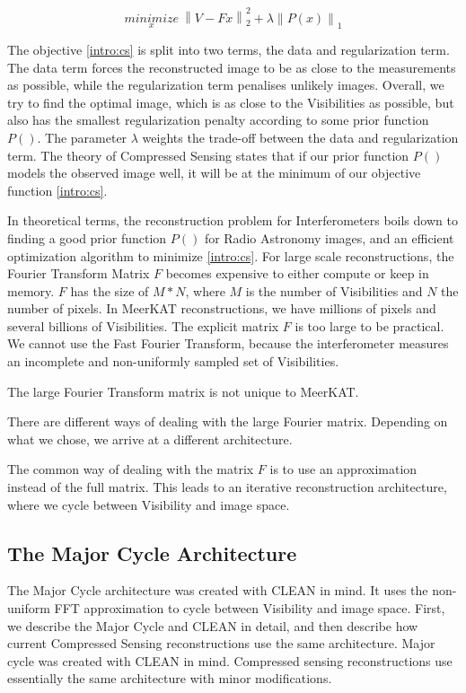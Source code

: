 \begin{equation}\label{intro:cs}
\underset{x}{minimize} \: \left \| V - Fx \right \|_2^2 + \lambda \left \| P(x) \right \|_1
\end{equation}

The objective \eqref{intro:cs} is split into two terms, the data and regularization term. The data term forces the reconstructed image to be as close to the measurements as possible, while the regularization term penalises unlikely images. Overall, we try to find the optimal image, which is as close to the Visibilities as possible, but also has the smallest regularization penalty according to some prior function $P()$. The parameter $\lambda$ weights the trade-off between the data and regularization term. The theory of Compressed Sensing states that if our prior function $P()$ models the observed image well, it will be at the minimum of our objective function \eqref{intro:cs}.

In theoretical terms, the reconstruction problem for Interferometers boils down to finding a good prior function $P()$ for Radio Astronomy images, and an efficient optimization algorithm to minimize \eqref{intro:cs}. For large scale reconstructions, the Fourier Transform Matrix $F$ becomes expensive to either compute or keep in memory. $F$ has the size of $M*N$, where $M$ is the number of Visibilities and $N$ the number of pixels. In MeerKAT reconstructions, we have millions of pixels and several billions of Visibilities. The explicit matrix $F$ is too large to be practical. We cannot use the Fast Fourier Transform, because the interferometer measures an incomplete and non-uniformly sampled set of Visibilities.

The large Fourier Transform matrix is not unique to MeerKAT. 

There are different ways of dealing with the large Fourier matrix. Depending on what we chose, we arrive at a different architecture.

The common way of dealing with the matrix $F$ is to use an approximation instead of the full matrix. This leads to an iterative reconstruction architecture, where we cycle between Visibility and image space.


\subsection{The Major Cycle Architecture}
The Major Cycle architecture was created with CLEAN in mind. It uses the non-uniform FFT approximation to cycle between Visibility and image space. First, we describe the Major Cycle and CLEAN in detail, and then describe how current Compressed Sensing reconstructions use the same architecture.
Major cycle was created with CLEAN in mind. Compressed sensing reconstructions use essentially the same architecture with minor modifications. 

